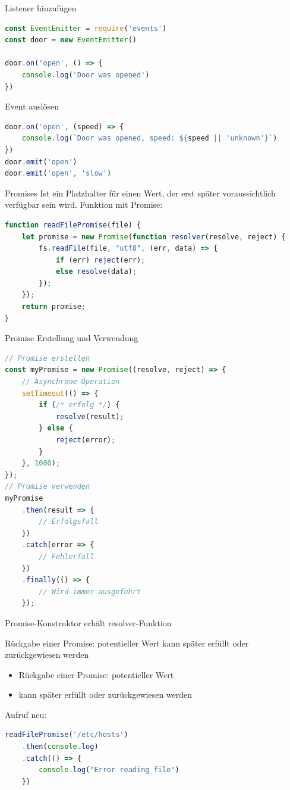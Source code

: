 \begin{examplecode}{Listener hinzufügen}
\begin{lstlisting}[language=JavaScript, style=basesmol]
const EventEmitter = require('events')
const door = new EventEmitter()

door.on('open', () => {
    console.log('Door was opened')
})
\end{lstlisting}
\end{examplecode}

\begin{examplecode}{Event auslösen}
\begin{lstlisting}[language=JavaScript, style=basesmol]
door.on('open', (speed) => {
    console.log(`Door was opened, speed: ${speed || 'unknown'}`)
})
door.emit('open')
door.emit('open', 'slow')
\end{lstlisting}
\end{examplecode}

\begin{definition}{Promises}
Ist ein Platzhalter für einen Wert, der erst später voraussichtlich verfügbar sein wird.
Funktion mit Promise:
\begin{lstlisting}[language=JavaScript, style=basesmol]
function readFilePromise(file) {
    let promise = new Promise(function resolver(resolve, reject) {
        fs.readFile(file, "utf8", (err, data) => {
            if (err) reject(err);
            else resolve(data);
        });
    });
    return promise;
}
\end{lstlisting}
\end{definition}



\begin{KR}{Promise Erstellung und Verwendung}
\begin{lstlisting}[language=JavaScript, style=basesmol]
// Promise erstellen
const myPromise = new Promise((resolve, reject) => {
    // Asynchrone Operation
    setTimeout(() => {
        if (/* erfolg */) {
            resolve(result);
        } else {
            reject(error);
        }
    }, 1000);
});
// Promise verwenden
myPromise
    .then(result => {
        // Erfolgsfall
    })
    .catch(error => {
        // Fehlerfall
    })
    .finally(() => {
        // Wird immer ausgefuhrt
    });
\end{lstlisting}
\end{KR}

\begin{concept}{Promise-Konstruktor erhält resolver-Funktion}

Rückgabe einer Promise: potentieller Wert kann später erfüllt oder zurückgewiesen werden
\begin{itemize}
  \item Rückgabe einer Promise: potentieller Wert
  \item kann später erfüllt oder zurückgewiesen werden
\end{itemize}
Aufruf neu:
\begin{lstlisting}[language=JavaScript, style=basesmol]
readFilePromise('/etc/hosts')
    .then(console.log)
    .catch(() => {
        console.log("Error reading file")
    })
\end{lstlisting}
\end{concept}

